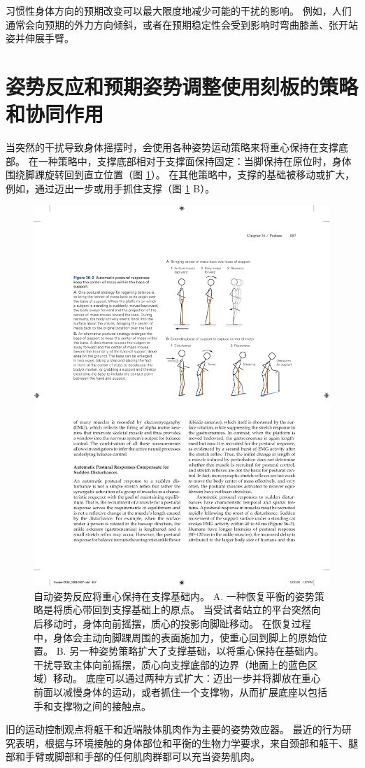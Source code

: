 习惯性身体方向的预期改变可以最大限度地减少可能的干扰的影响。 例如，人们通常会向预期的外力方向倾斜，或者在预期稳定性会受到影响时弯曲膝盖、张开站姿并伸展手臂。


\section{姿势反应和预期姿势调整使用刻板的策略和协同作用}
当突然的干扰导致身体摇摆时，会使用各种姿势运动策略来将重心保持在支撑底部。 
在一种策略中，支撑底部相对于支撑面保持固定：当脚保持在原位时，身体围绕脚踝旋转回到直立位置（图 \ref{fig:36_2}）。 
在其他策略中，支撑的基础被移动或扩大，例如，通过迈出一步或用手抓住支撑（图 \ref{fig:36_2} B）。

\begin{figure}[htbp]
	\centering
	\includegraphics[width=0.6\linewidth]{chap36/fig_36_2}
	\caption{自动姿势反应将重心保持在支撑基础内。 A. 一种恢复平衡的姿势策略是将质心带回到支撑基础上的原点。 当受试者站立的平台突然向后移动时，身体向前摇摆，质心的投影向脚趾移动。 在恢复过程中，身体会主动向脚踝周围的表面施加力，使重心回到脚上的原始位置。 B. 另一种姿势策略扩大了支撑基础，以将重心保持在基础内。 干扰导致主体向前摇摆，质心向支撑底部的边界（地面上的蓝色区域）移动。 底座可以通过两种方式扩大：迈出一步并将脚放在重心前面以减慢身体的运动，或者抓住一个支撑物，从而扩展底座以包括手和支撑物之间的接触点。}
	\label{fig:36_2}
\end{figure}

旧的运动控制观点将躯干和近端肢体肌肉作为主要的姿势效应器。 最近的行为研究表明，根据与环境接触的身体部位和平衡的生物力学要求，来自颈部和躯干、腿部和手臂或脚部和手部的任何肌肉群都可以充当姿势肌肉。

